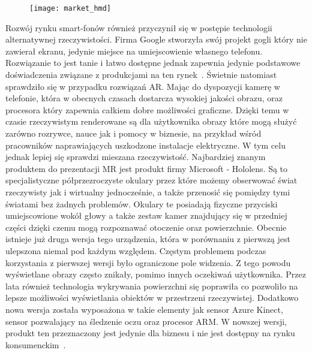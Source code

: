 	\begin{figure}[h]
\centering
\texttt{[image: market\_hmd]}
\label{fig:market_hmd}
\end{figure}
 Rozwój rynku smart-fonów również przyczynił się w postępie technologii alternatywnej rzeczywistości. Firma Google stworzyła swój projekt gogli który nie zawierał ekranu, jedynie miejsce na umiejscowienie własnego telefonu. Rozwiązanie to jest tanie i łatwo dostępne jednak zapewnia jedynie podstawowe doświadczenia związane z produkcjami na ten rynek~\cite{daydream}. Świetnie natomiast sprawdziło się w przypadku rozwiązań AR. Mając do dyspozycji kamerę w telefonie, która w obecnych czasach dostarcza wysokiej jakości obrazu, oraz procesora który zapewnia całkiem dobre możliwości graficzne. Dzięki temu w czasie rzeczywistym renderowane są dla użytkownika obrazy które mogą służyć zarówno rozrywce, nauce jak i pomocy w biznesie, na przykład wśród pracowników naprawiających uszkodzone instalacje elektryczne. W tym celu jednak lepiej się sprawdzi mieszana rzeczywistość. Najbardziej znanym produktem do prezentacji MR jest produkt firmy Microsoft - Hololens. Są to specjalistyczne półprzezroczyste okulary przez które możemy obserwować świat rzeczywisty jak i wirtualny jednocześnie, a także przenosić się pomiędzy tymi światami bez żadnych problemów. Okulary te posiadają fizyczne przyciski umiejscowione wokół głowy a także zestaw kamer znajdujący się w przedniej części dzięki czemu mogą rozpoznawać otoczenie oraz powierzchnie. Obecnie istnieje już druga wersja tego urządzenia, która w porównaniu z pierwszą jest ulepszona niemal pod każdym względem. Częstym problemem podczas korzystania z pierwszej wersji było ograniczone pole widzenia. Z tego powodu wyświetlane obrazy często znikały, pomimo innych oczekiwań użytkownika. Przez lata również technologia wykrywania powierzchni się poprawiła co pozwoliło na lepsze możliwości wyświetlania obiektów w przestrzeni rzeczywistej. Dodatkowo nowa wersja została wyposażona w takie elementy jak sensor Azure Kinect, sensor pozwalający na śledzenie oczu oraz procesor ARM. W nowszej wersji, produkt ten przeznaczony jest jedynie dla biznesu i nie jest dostępny na rynku konsumenckim~\cite{holo}.
	 
  

